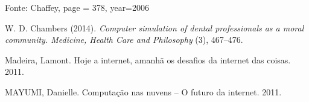 \documentclass[conference,compsoc]{IEEEtran}
\begin{document}
\begin{thebibliography}{1}
Fonte: Chaffey,
page = 378,
year=2006




W. D. Chambers (2014).
\emph{Computer simulation of dental professionals as a moral community. Medicine, Health Care and Philosophy}
(3), 467–476.




Madeira, Lamont. Hoje a internet, amanhã os desafios da internet das coisas. 2011.

MAYUMI, Danielle. Computação nas nuvens – O futuro da internet. 2011.



\end{thebibliography}






\end{document}
